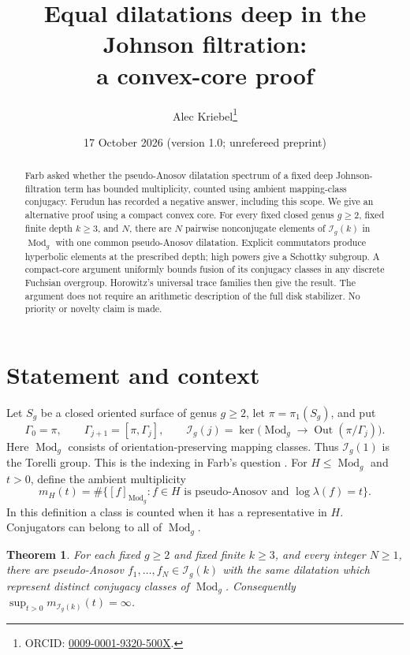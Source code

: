 \documentclass[11pt]{article}
\title{Equal dilatations deep in the Johnson filtration:\\a convex-core proof}
\author{Alec Kriebel\thanks{ORCID: \href{https://orcid.org/0009-0001-9320-500X}{0009-0001-9320-500X}.}}
\date{17 October 2026 \quad (version 1.0; unrefereed preprint)}
\newtheorem{theorem}{Theorem}
\theoremstyle{remark}\newtheorem*{remark}{Remark}
\newcommand{\Mod}{\operatorname{Mod}}
\newcommand{\Out}{\operatorname{Out}}
\newcommand{\I}{\mathcal I}
\begin{document}
\maketitle
\begin{abstract}
Farb asked whether the pseudo-Anosov dilatation spectrum of a fixed deep
Johnson-filtration term has bounded multiplicity, counted using ambient
mapping-class conjugacy. Ferudun has recorded a negative answer, including
this scope. We give an alternative proof using a compact convex core.
For every fixed closed genus $g\ge2$, fixed finite depth $k\ge3$, and $N$,
there are $N$ pairwise nonconjugate elements of $\I_g(k)$ in $\Mod_g$
with one common pseudo-Anosov dilatation. Explicit commutators produce
hyperbolic elements at the prescribed depth; high powers give a Schottky
subgroup. A compact-core argument uniformly bounds fusion of its conjugacy
classes in any discrete Fuchsian overgroup. Horowitz's universal trace
families then give the result. The argument does not require an arithmetic
description of the full disk stabilizer. No priority or novelty claim is made.
\end{abstract}

\section{Statement and context}
Let $S_g$ be a closed oriented surface of genus $g\ge2$, let
$\pi=\pi_1(S_g)$, and put
\[
 \Gamma_0=\pi,\qquad \Gamma_{j+1}=[\pi,\Gamma_j],\qquad
 \I_g(j)=\ker\bigl(\Mod_g\longrightarrow\Out(\pi/\Gamma_j)\bigr).
\]
Here $\Mod_g$ consists of orientation-preserving mapping classes.
Thus $\I_g(1)$ is the Torelli group. This is the indexing in
Farb's question \cite[\S1.2 and Question 7.6]{Farb}.
For $H\le\Mod_g$ and $t>0$, define the ambient multiplicity
\[
 m_H(t)=\#\{[f]_{\Mod_g}: f\in H\text{ is pseudo-Anosov and }
                         \log\lambda(f)=t\}.
\]
In this definition a class is counted when it has a representative in $H$.
Conjugators can belong to all of $\Mod_g$.

\begin{theorem}\label{thm:main}
For each fixed $g\ge2$ and fixed finite $k\ge3$, and every integer $N\ge1$,
there are pseudo-Anosov $f_1,\ldots,f_N\in\I_g(k)$ with the same dilatation
which represent distinct conjugacy classes of $\Mod_g$.
Consequently $\sup_{t>0}m_{\I_g(k)}(t)=\infty$.
\end{theorem}
\end{document}

